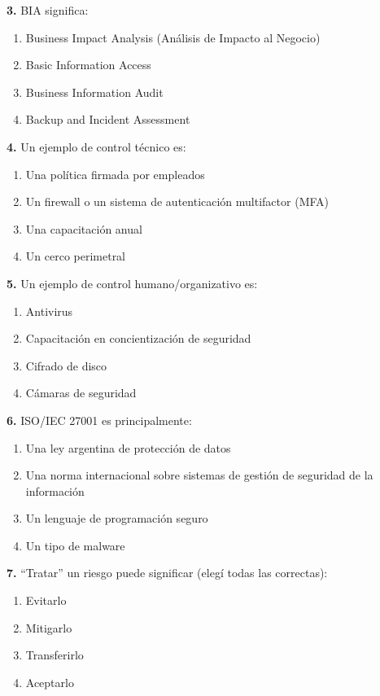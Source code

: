 \documentclass[12pt,a4paper]{article}
\begin{document}
\textbf{3.} BIA significa:
\begin{enumerate}[label=\alph*), leftmargin=2.5em]
  \item Business Impact Analysis (An\'alisis de Impacto al Negocio)
  \item Basic Information Access
  \item Business Information Audit
  \item Backup and Incident Assessment
\end{enumerate}

\textbf{4.} Un ejemplo de control t\'ecnico es:
\begin{enumerate}[label=\alph*), leftmargin=2.5em]
  \item Una pol\'itica firmada por empleados
  \item Un firewall o un sistema de autenticaci\'on multifactor (MFA)
  \item Una capacitaci\'on anual
  \item Un cerco perimetral
\end{enumerate}

\textbf{5.} Un ejemplo de control humano/organizativo es:
\begin{enumerate}[label=\alph*), leftmargin=2.5em]
  \item Antivirus
  \item Capacitaci\'on en concientizaci\'on de seguridad
  \item Cifrado de disco
  \item C\'amaras de seguridad
\end{enumerate}

\textbf{6.} ISO/IEC 27001 es principalmente:
\begin{enumerate}[label=\alph*), leftmargin=2.5em]
  \item Una ley argentina de protecci\'on de datos
  \item Una norma internacional sobre sistemas de gesti\'on de seguridad de la informaci\'on
  \item Un lenguaje de programaci\'on seguro
  \item Un tipo de malware
\end{enumerate}

\textbf{7.} ``Tratar'' un riesgo puede significar (eleg\'i todas las correctas):
\begin{enumerate}[label=\alph*), leftmargin=2.5em]
  \item Evitarlo
  \item Mitigarlo
  \item Transferirlo
  \item Aceptarlo
\end{enumerate}
\end{document}
